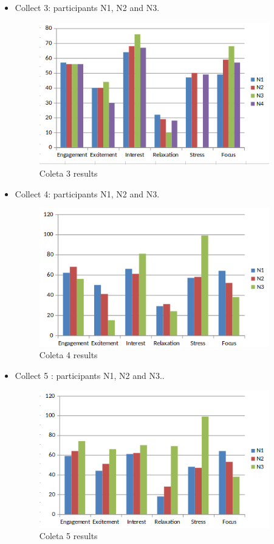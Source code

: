 \documentclass[12pt,openright,a4paper]{article}
\begin{document}
\begin{itemize}
\item Collect 3: participants N1, N2 and N3.
\begin{figure}[H]
	\centering
	\includegraphics[width=10cm]{./Coleta3.png}
	\caption{Coleta 3 results}
\end{figure}
\item Collect 4: participants N1, N2 and N3.
\begin{figure}[H]
	\centering
	\includegraphics[width=10cm]{./Coleta4.png}
	\caption{Coleta 4 results}
\end{figure}
\item Collect 5 : participants N1, N2 and N3..
\begin{figure}[H]
	\centering
	\includegraphics[width=10cm]{./Coleta5.png}
	\caption{Coleta 5 results}
\end{figure}

\end{itemize}
\end{document}
